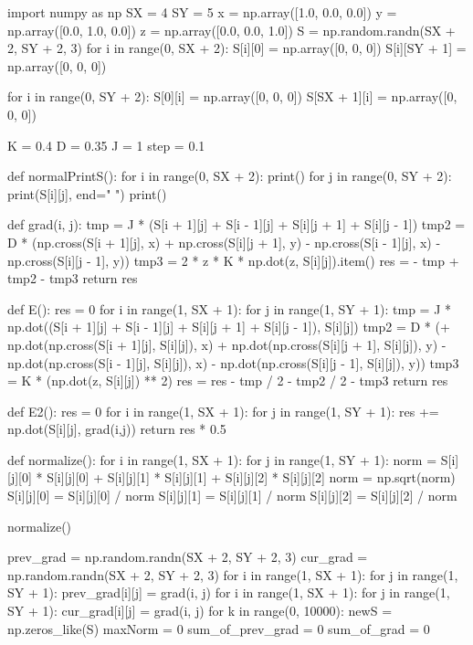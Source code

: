 \documentclass[ 12pt,x11names]{article}
\begin{document}
 \begin{python}
 import numpy as np
SX = 4
SY = 5
x = np.array([1.0, 0.0, 0.0])
y = np.array([0.0, 1.0, 0.0])
z = np.array([0.0, 0.0, 1.0])
S = np.random.randn(SX + 2, SY + 2, 3)
for i in range(0, SX + 2):
    S[i][0] = np.array([0, 0, 0])
    S[i][SY + 1] = np.array([0, 0, 0])

for i in range(0, SY + 2):
    S[0][i] = np.array([0, 0, 0])
    S[SX + 1][i] = np.array([0, 0, 0])

K = 0.4
D = 0.35
J = 1
step = 0.1

def normalPrintS():
    for i in range(0, SX + 2):
        print()
        for j in range(0, SY + 2):
            print(S[i][j], end=" ")
    print()


def grad(i, j):
    tmp = J * (S[i + 1][j] + S[i - 1][j] +
        S[i][j + 1] + S[i][j - 1])
    tmp2 = D * (np.cross(S[i + 1][j], x) +
    np.cross(S[i][j + 1], y) -
    np.cross(S[i - 1][j], x) - np.cross(S[i][j - 1], y))
    tmp3 = 2 * z * K * np.dot(z, S[i][j]).item()
    res = - tmp + tmp2 - tmp3
    return res


def E():
    res = 0
    for i in range(1, SX + 1):
        for j in range(1, SY + 1):
            tmp = J * np.dot((S[i + 1][j] + S[i - 1][j] + S[i][j + 1] + S[i][j - 1]), S[i][j])
            tmp2 = D * (+ np.dot(np.cross(S[i + 1][j], S[i][j]), x)
                        + np.dot(np.cross(S[i][j + 1], S[i][j]), y)
                        - np.dot(np.cross(S[i - 1][j], S[i][j]), x)
                        - np.dot(np.cross(S[i][j - 1], S[i][j]), y))
            tmp3 = K * (np.dot(z, S[i][j]) ** 2)
            res = res - tmp / 2 - tmp2 / 2 - tmp3
    return res

def E2():
    res = 0
    for i in range(1, SX + 1):
        for j in range(1, SY + 1):
            res += np.dot(S[i][j], grad(i,j))
    return res * 0.5

def normalize():
    for i in range(1, SX + 1):
        for j in range(1, SY + 1):
            norm = S[i][j][0] * S[i][j][0] + S[i][j][1] * S[i][j][1]
            + S[i][j][2] * S[i][j][2]
            norm = np.sqrt(norm)
            S[i][j][0] = S[i][j][0] / norm
            S[i][j][1] = S[i][j][1] / norm
            S[i][j][2] = S[i][j][2] / norm

normalize()

prev_grad =  np.random.randn(SX + 2, SY + 2, 3)
cur_grad = np.random.randn(SX + 2, SY + 2, 3)
for i in range(1, SX + 1):
    for j in range(1, SY + 1):
        prev_grad[i][j] = grad(i, j)
for i in range(1, SX + 1):
    for j in range(1, SY + 1):
        cur_grad[i][j] = grad(i,  j)
for k in range(0, 10000):
    newS = np.zeros_like(S)
    maxNorm = 0
    sum_of_prev_grad = 0
    sum_of_grad  =  0



\end{python}
\end{document}
